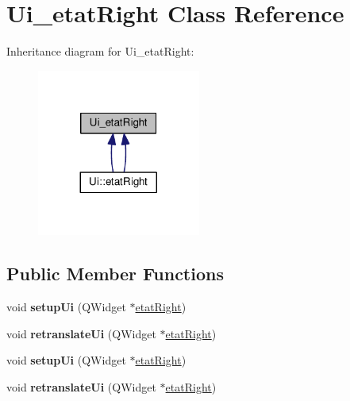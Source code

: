 \hypertarget{class_ui__etat_right}{\section{Ui\-\_\-etat\-Right Class Reference}
\label{class_ui__etat_right}
}


Inheritance diagram for Ui\-\_\-etat\-Right\-:
\nopagebreak
\begin{figure}[H]
\begin{center}
\leavevmode
\includegraphics[width=152pt]{class_ui__etat_right__inherit__graph}
\end{center}
\end{figure}
\subsection*{Public Member Functions}
\begin{DoxyCompactItemize}
\item 
\hypertarget{class_ui__etat_right_a19c54fd43d646f353282bc374f4c1e8a}{void {\bfseries setup\-Ui} (Q\-Widget $\ast$\hyperlink{classetat_right}{etat\-Right})}\label{class_ui__etat_right_a19c54fd43d646f353282bc374f4c1e8a}

\item 
\hypertarget{class_ui__etat_right_ae20f3075c259ee0be56cd0af3111dca5}{void {\bfseries retranslate\-Ui} (Q\-Widget $\ast$\hyperlink{classetat_right}{etat\-Right})}\label{class_ui__etat_right_ae20f3075c259ee0be56cd0af3111dca5}

\item 
\hypertarget{class_ui__etat_right_a19c54fd43d646f353282bc374f4c1e8a}{void {\bfseries setup\-Ui} (Q\-Widget $\ast$\hyperlink{classetat_right}{etat\-Right})}\label{class_ui__etat_right_a19c54fd43d646f353282bc374f4c1e8a}

\item 
\hypertarget{class_ui__etat_right_ae20f3075c259ee0be56cd0af3111dca5}{void {\bfseries retranslate\-Ui} (Q\-Widget $\ast$\hyperlink{classetat_right}{etat\-Right})}\label{class_ui__etat_right_ae20f3075c259ee0be56cd0af3111dca5}

\end{DoxyCompactItemize}
